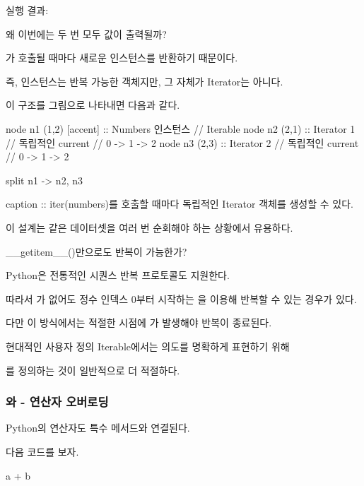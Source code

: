 실행 결과:

\begin{dhkzsh}
[0, 1, 2]
[0, 1, 2]
\end{dhkzsh}

왜 이번에는 두 번 모두 값이 출력될까?

가 호출될 때마다 새로운  인스턴스를 반환하기 때문이다.

즉,  인스턴스는 반복 가능한 객체지만, 그 자체가 Iterator는 아니다.

이 구조를 그림으로 나타내면 다음과 같다.

\begin{dhkgraph}[uniform]
node n1 (1,2) [accent] :: Numbers 인스턴스 // Iterable
node n2 (2,1) :: Iterator 1 // 독립적인 current // 0 -> 1 -> 2
node n3 (2,3) :: Iterator 2 // 독립적인 current // 0 -> 1 -> 2

split n1 -> n2, n3

caption :: iter(numbers)를 호출할 때마다 독립적인 Iterator 객체를 생성할 수 있다.
\end{dhkgraph}

이 설계는 같은 데이터셋을 여러 번 순회해야 하는 상황에서 유용하다.

\begin{dhknote}
\begin{dhksmry}[centered]
__getitem__()만으로도 반복이 가능한가?
\end{dhksmry}
\end{dhknote}

Python은 전통적인 시퀀스 반복 프로토콜도 지원한다.

따라서 가 없어도 정수 인덱스 0부터 시작하는 을 이용해 반복할 수 있는 경우가 있다.

다만 이 방식에서는 적절한 시점에 가 발생해야 반복이 종료된다.

현대적인 사용자 정의 Iterable에서는 의도를 명확하게 표현하기 위해 

를 정의하는 것이 일반적으로 더 적절하다.

\subsubsection{와  - 연산자 오버로딩}

Python의 연산자도 특수 메서드와 연결된다.

다음 코드를 보자.

\begin{dhkcode}
a + b
\end{dhkcode}

